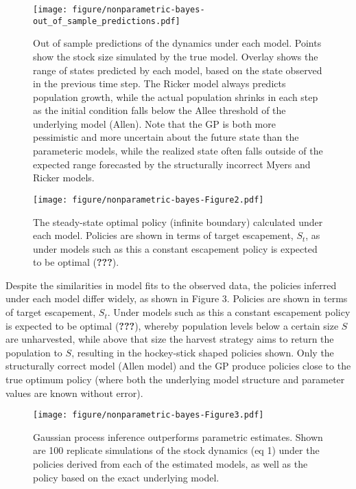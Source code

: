 \documentclass[author-year, review]{elsarticle} %
\makeatletter
\def\maxwidth{\ifdim\Gin@nat@width>\linewidth\linewidth
\else\Gin@nat@width\fi}
\let\Oldincludegraphics\includegraphics
\renewcommand{\includegraphics}[1]{\Oldincludegraphics[width=\maxwidth]{#1}}
\makeatother
\begin{document}
\begin{figure}[htbp]
\centering
\texttt{[image: figure/nonparametric-bayes-out\_of\_sample\_predictions.pdf]}
\caption{Out of sample predictions of the dynamics under each model.
Points show the stock size simulated by the true model. Overlay shows
the range of states predicted by each model, based on the state observed
in the previous time step. The Ricker model always predicts population
growth, while the actual population shrinks in each step as the initial
condition falls below the Allee threshold of the underlying model
(Allen). Note that the GP is both more pessimistic and more uncertain
about the future state than the parameteric models, while the realized
state often falls outside of the expected range forecasted by the
structurally incorrect Myers and Ricker models.}
\end{figure}

\begin{figure}[htbp]
\centering
\texttt{[image: figure/nonparametric-bayes-Figure2.pdf]}
\caption{The steady-state optimal policy (infinite boundary) calculated
under each model. Policies are shown in terms of target escapement,
$S_t$, as under models such as this a constant escapement policy is
expected to be optimal ({\textbf{???}}).}
\end{figure}

Despite the similarities in model fits to the observed data, the
policies inferred under each model differ widely, as shown in Figure 3.
Policies are shown in terms of target escapement, $S_t$. Under models
such as this a constant escapement policy is expected to be optimal
({\textbf{???}}), whereby population levels below a certain size $S$ are
unharvested, while above that size the harvest strategy aims to return
the population to $S$, resulting in the hockey-stick shaped policies
shown. Only the structurally correct model (Allen model) and the GP
produce policies close to the true optimum policy (where both the
underlying model structure and parameter values are known without
error).

\begin{figure}[htbp]
\centering
\texttt{[image: figure/nonparametric-bayes-Figure3.pdf]}
\caption{Gaussian process inference outperforms parametric estimates.
Shown are 100 replicate simulations of the stock dynamics (eq 1) under
the policies derived from each of the estimated models, as well as the
policy based on the exact underlying model.}
\end{figure}
\end{document}
